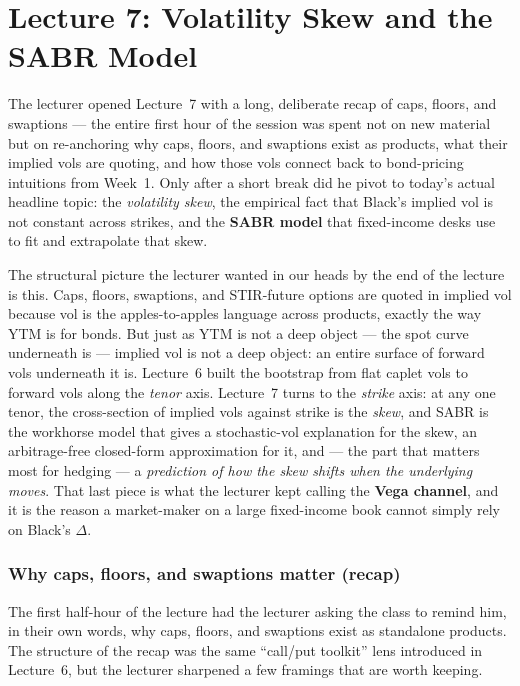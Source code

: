 \part*{Lecture 7: Volatility Skew and the SABR Model}

The lecturer opened Lecture~7 with a long, deliberate recap of caps,
floors, and swaptions --- the entire first hour of the session was spent
not on new material but on re-anchoring why caps, floors, and swaptions
exist as products, what their implied vols are quoting, and how those
vols connect back to bond-pricing intuitions from Week~1. Only after a
short break did he pivot to today's actual headline topic: the
\emph{volatility skew}, the empirical fact that Black's implied vol is
not constant across strikes, and the \textbf{SABR model} that fixed-income
desks use to fit and extrapolate that skew.

The structural picture the lecturer wanted in our heads by the end of
the lecture is this. Caps, floors, swaptions, and STIR-future options
are quoted in implied vol because vol is the apples-to-apples language
across products, exactly the way YTM is for bonds. But just as YTM is
not a deep object --- the spot curve underneath is --- implied vol is
not a deep object: an entire surface of forward vols underneath it is.
Lecture~6 built the bootstrap from flat caplet vols to forward vols
along the \emph{tenor} axis. Lecture~7 turns to the \emph{strike} axis:
at any one tenor, the cross-section of implied vols against strike is
the \emph{skew}, and SABR is the workhorse model that gives a stochastic-vol
explanation for the skew, an arbitrage-free closed-form approximation
for it, and --- the part that matters most for hedging --- a
\emph{prediction of how the skew shifts when the underlying moves}.
That last piece is what the lecturer kept calling the
\textbf{Vega channel}, and it is the reason a market-maker on a large
fixed-income book cannot simply rely on Black's $\Delta$.

\section{Why caps, floors, and swaptions matter (recap)}\label{L7-sec:recap}

The first half-hour of the lecture had the lecturer asking the class
to remind him, in their own words, why caps, floors, and swaptions
exist as standalone products. The structure of the recap was the same
``call/put toolkit'' lens introduced in Lecture~6, but the lecturer
sharpened a few framings that are worth keeping.

